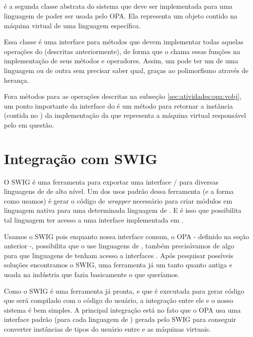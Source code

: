   \subsection{\VData{}}
  \label{sec:atividades:opa:vdata}
  \VData{} é a segunda classe abstrata do sistema que deve ser implementada para uma linguagem
  de \script{} poder ser usada pelo OPA. Ela representa um objeto contido na máquina virtual
  de uma linguagem específica.
  
  Essa classe é uma interface para métodos que devem implementar todas aquelas operações do 
  \VObj{} (descritas anteriormente), de forma que o \VObj{} chama essas funções na implementação
  de seus métodos e operadores. Assim, um \VObj{} pode ter um \VData{} de uma linguagem 
  ou de outra sem precisar saber qual, graças ao polimorfismo através de herança.
  
  Fora métodos para as operações descritas na subseção \ref{sec:atividades:opa:vobj}, um ponto
  importante da interface do \VData{} é um método para retornar a instância (contida no \SMgr{}) 
  da implementação da \VMac{} que representa a máquina virtual responsável pelo
  \VData{} em questão.
  
  
  \section{Integração com SWIG}
  \label{sec:actividads:integracaoswig}
  O SWIG é uma ferramenta para exportar uma interface \C{}/\CXX{} para diversas 
  linguagens de \script{} de alto nível. Um dos usos padrão dessa ferramenta (e 
  a forma como usamos) é gerar o código de \textit{wrapper} necessário para criar 
  módulos em linguagem nativa para uma determinada linguagem de \script{}.
  E é isso que possibilita tal linguagem ter acesso a uma interface implementada em \CXX{}.
  
  Usamos o SWIG pois enquanto nossa interface comum, o OPA - definido na seção anterior -, 
  possibilita que o \CXX{} use linguagens de \script{}, também precisávamos de algo para que linguagens 
  de \script{} tenham acesso a interfaces \CXX{}. Após pesquisar possíveis soluções encontramos
  o SWIG, uma ferramenta já um tanto quanto antiga e usada na indústria que fazia basicamente o
  que queríamos.
  
  Como o SWIG é uma ferramenta já pronta, e que é executada para gerar código que será compilado
  com o código do usuário, a integração entre ele e o nosso sistema é bem simples. A principal
  integração está no fato que o OPA usa uma interface padrão (para cada linguagem de \script{})
  gerada pelo SWIG para conseguir converter instâncias de tipos do usuário entre \CXX{} e as
  máquinas virtuais.
  
